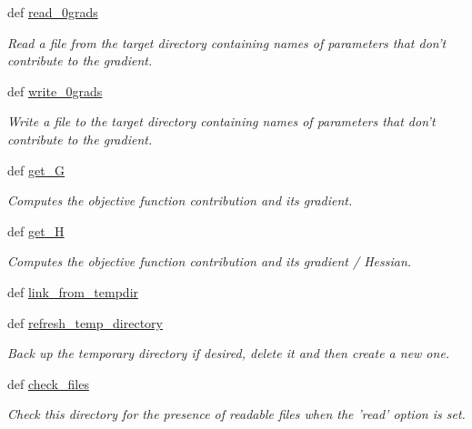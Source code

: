 \begin{DoxyCompactItemize}
def \hyperlink{classforcebalance_1_1target_1_1Target_a09bb0e8350a17974c908a9728b2709bf}{read\-\_\-0grads}
\begin{DoxyCompactList}\small\item\em Read a file from the target directory containing names of parameters that don't contribute to the gradient. \end{DoxyCompactList}\item 
def \hyperlink{classforcebalance_1_1target_1_1Target_acc7601caa4b719bf7e31961c2eb30dd7}{write\-\_\-0grads}
\begin{DoxyCompactList}\small\item\em Write a file to the target directory containing names of parameters that don't contribute to the gradient. \end{DoxyCompactList}\item 
def \hyperlink{classforcebalance_1_1target_1_1Target_afa8cc38c8bba8861c072e789717aa049}{get\-\_\-\-G}
\begin{DoxyCompactList}\small\item\em Computes the objective function contribution and its gradient. \end{DoxyCompactList}\item 
def \hyperlink{classforcebalance_1_1target_1_1Target_a1d2ee27fe86a09769c1816af23b09adb}{get\-\_\-\-H}
\begin{DoxyCompactList}\small\item\em Computes the objective function contribution and its gradient / Hessian. \end{DoxyCompactList}\item 
def \hyperlink{classforcebalance_1_1target_1_1Target_a5aa4958cea0a48138511567a076c5a82}{link\-\_\-from\-\_\-tempdir}
\item 
def \hyperlink{classforcebalance_1_1target_1_1Target_afe815eafab06ac92f10bbf4b88ad95c8}{refresh\-\_\-temp\-\_\-directory}
\begin{DoxyCompactList}\small\item\em Back up the temporary directory if desired, delete it and then create a new one. \end{DoxyCompactList}\item 
def \hyperlink{classforcebalance_1_1target_1_1Target_ac790529c5f85f0547fe3601ad1cf2419}{check\-\_\-files}
\begin{DoxyCompactList}\small\item\em Check this directory for the presence of readable files when the 'read' option is set. \end{DoxyCompactList}\item 

\end{DoxyCompactItemize}
